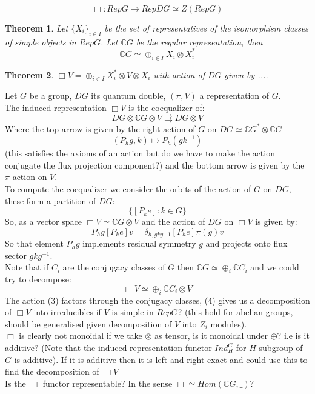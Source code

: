 \documentclass{article}
\newtheorem{theorem}{Theorem}
\begin{document}
$$\Box: RepG \rightarrow RepDG\simeq Z(RepG)$$
\begin{theorem}
Let $\{X_i\}_{i\in I}$ be the set of representatives of the isomorphism classes of simple objects in $RepG$. Let $\mathbb{C}G$ be the regular representation, then $$\mathbb{C}G \simeq \oplus_{i\in I}X_i\otimes X_i^*$$
\end{theorem}
\begin{theorem}
$\Box V = \oplus_{i\in I}X_i^*\otimes V \otimes X_i$ with action of $DG$ given by ....
\end{theorem}
Let $G$ be a group, $DG$ its quantum double, $(\pi,V)$ a representation of $G$. \\
The induced representation $\Box V$ is the coequalizer of: \\
$$DG \otimes \mathbb{C}G \otimes V \rightrightarrows DG\otimes V$$ 
Where the top arrow is given by the right action of $G$ on $DG \simeq \mathbb{C}G^* \otimes \mathbb{C}G$ 
$$ (P_hg, k) \mapsto P_h (gk^{-1})$$
(this satisfies the axioms of an action but do we have to make the action conjugate the flux projection component?) and the bottom arrow is given by the $\pi$ action on $V$. \\
To compute the coequalizer we consider the orbits of the action of $G$ on $DG$, these form a partition of $DG$:
$$ \{[P_ke] : k \in G\} $$
So, as a vector space $\Box V \simeq \mathbb{C}G \otimes V$ and the action of $DG$ on $\Box V$ is given by:
\begin{equation}
P_hg [P_ke]v = \delta_{h,gkg{-1}} [P_he] \pi(g)v
\end{equation} 
So that element $P_hg$ implements residual symmetry $g$ and projects onto flux sector $gkg^{-1}$. \\
Note that if $C_i$ are the conjugacy classes of $G$ then $\mathbb{C}G \simeq \oplus_i \mathbb{C}C_i$ and we could try to decompose:
\begin{equation}
\Box V \simeq \oplus_i \mathbb{C}C_i \otimes V
\end{equation}
The action (3) factors through the conjugacy classes, (4) gives us a decomposition of $ \Box V$ into irreducibles if $V$ is simple in $RepG$? (this hold for abelian groups, should be generalised given decomposition of $V$ into $Z_i$ modules). \\
$\Box$ is clearly not monoidal if we take $\otimes$ as tensor, is it monoidal under $\oplus$? i.e is it additive? (Note that the induced representation functor $Ind_H^G$ for $H$ subgroup of $G$ is additive). If it is additive then it is left and right exact and could use this to find the decomposition of $ \Box V$ \\
Is the $\Box$ functor representable? In the sense $\Box \simeq Hom(\mathbb{C}G,\_)$?
\end{document}
